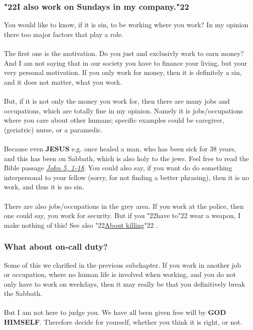 \documentclass[12pt,a5paper]{article}
\newcommand{\God}[0]{\textbf{GOD}}
\newcommand{\Himself}[0]{\textbf{HIMSELF}}
\newcommand{\Jesus}[0]{\textbf{JESUS}}
\newcommand{\q}[1]{\char"22{#1}\char"22 }
\begin{document}
	\subsubsection{\q{I also work on Sundays in my company.}}
		You would like to know,
		if it is sin,
		to be working where you work?
		In my opinion there too major factors that play a role.
		\\
		\\
		The first one is the motivation.
		Do you just and exclusivly work to earn money?
		And I am not saying that in our society you have to finance your living,
		but your very personal motivation.
		If you only work for money,
		then it is definitely a sin,
		and it does not matter,
		what you work.
		\\
		\\
		But,
		if it is not only the money you work for,
		then there are many jobs and occupations,
		which are totally fine in my opinion.
		Namely it is jobs/occupations where you care about other humans;
		specific examples could be
		caregiver,
		(geriatric) nurse,
		or a paramedic.
		\\
		\\
		Because even {\Jesus} e.g. once healed a man,
		who has been sick for 38 years,
		and this has been on Sabbath,
		which is also holy to the jews.
		Feel free to read the Bible passage \textit{\href{https://www.die-bibel.de/bibeln/online-bibeln/lesen/ESV/JHN.5/John-5}{John 5, 1-18}}.
		You could also say,
		if you want do do something interpersonal to your fellow
		(sorry,
		for not finding a better phrasing),
		then it is no work,
		and thus it is no sin.
		\\
		\\
		There are also jobs/occupations in the grey area.
		If you work at the police,
		then one could say,
		you work for security.
		But if you \q{have to} wear a weapon,
		I make nothing of this!
		See also \q{\hyperref[VomToeten]{About killing}}.

	\subsubsection{What about on-call duty?}
		Some of this we clarified in the previous subchapter.
		If you work in another job or occupation,
		where no human life is involved when working,
		and you do not only have to work on weekdays,
		then it may really be that you definitively break the Sabbath.
		\\
		\\
		But I am not here to judge you.
		We have all been given free will by {\God} {\Himself}.
		Therefore decide for yourself,
		whether you think it is right,
		or not.
		
\end{document}
